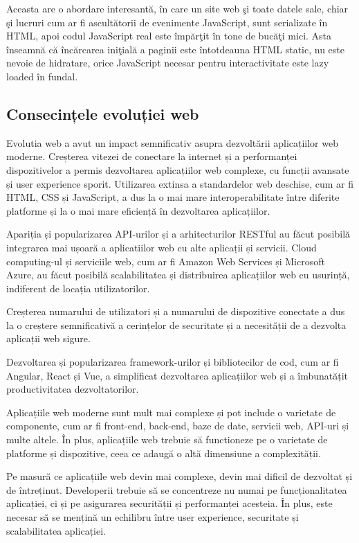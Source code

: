 \documentclass[12pt, a4paper]{report}
\begin{document}
Aceasta are o abordare interesant\u a, \^ in care un site web \c si toate datele sale, chiar \c si lucruri cum ar fi ascult\u atorii de evenimente JavaScript, sunt serializate \^ in HTML, apoi codul JavaScript real este \^ imp\u ar\c tit \^ in tone de buc\u a\c ti mici. Asta \^ inseamn\u a c\u a \^ inc\u arcarea ini\c tial\u a a paginii este \^ intotdeauna HTML static, nu este nevoie de hidratare, orice JavaScript necesar pentru interactivitate este lazy loaded \^ in fundal.



\subsection{Consecințele evoluției web}
Evolutia web a avut un impact semnificativ asupra dezvoltării aplicațiilor web moderne. Creșterea vitezei de conectare la internet și a performanței dispozitivelor a permis dezvoltarea aplicațiilor web complexe, cu funcții avansate și user experience sporit. Utilizarea extinsa a standardelor web deschise, cum ar fi HTML, CSS și JavaScript, a dus la o mai mare interoperabilitate între diferite platforme și la o mai mare eficiență în dezvoltarea aplicațiilor.

Apariția și popularizarea API-urilor și a arhitecturilor RESTful au făcut posibilă integrarea mai ușoară a aplicatiilor web cu alte aplicații și servicii. Cloud computing-ul și serviciile web, cum ar fi Amazon Web Services și Microsoft Azure, au făcut posibilă scalabilitatea și distribuirea aplicațiilor web cu usurință, indiferent de locația utilizatorilor.

Creșterea numarului de utilizatori și a numarului de dispozitive conectate a dus la o creștere semnificativă a cerințelor de securitate și a necesității de a dezvolta aplicații web sigure.

Dezvoltarea și popularizarea framework-urilor și bibliotecilor de cod, cum ar fi Angular, React și Vue, a simplificat dezvoltarea aplicațiilor web și a îmbunatățit productivitatea dezvoltatorilor.

Aplicațiile web moderne sunt mult mai complexe și pot include o varietate de componente, cum ar fi front-end, back-end, baze de date, servicii web, API-uri și multe altele. În plus, aplicațiile web trebuie să functioneze pe o varietate de platforme și dispozitive, ceea ce adaugă o altă dimensiune a complexității.

Pe masură ce aplicațiile web devin mai complexe, devin mai dificil de dezvoltat și de întreținut. Developerii trebuie să se concentreze nu numai pe funcționalitatea aplicației, ci și pe asigurarea securității și performanței acesteia. În plus, este necesar să se mențină un echilibru între user experience, securitate și scalabilitatea aplicației.
\end{document}
